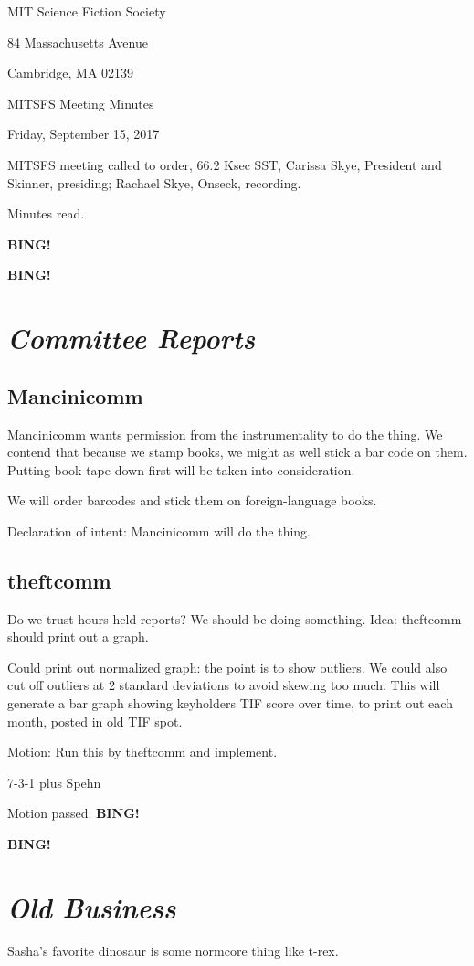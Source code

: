 \documentclass[10pt]{article}
\newcommand{\bing}{{\bf BING!} }
\newcommand{\goto}[1]{\bing \vskip 12pt \section*{{\em{#1}}}}
\newcommand{\ps}{ plus Spehn\xspace}
\newcommand{\skinner}{Carissa Skye, President and Skinner}
\newcommand{\onseck}{Rachael Skye, Onseck}
\newcommand{\meetingdate}{Friday, September 15, 2017}
\begin{document}
\begin{center}

MIT Science Fiction Society

84 Massachusetts Avenue

Cambridge, MA 02139

\vspace{12pt}

MITSFS Meeting Minutes

\meetingdate

\end{center}

\vspace{18pt}

\setlength{\parskip}{6pt}

\noindent
MITSFS meeting called to order, 66.2 Ksec SST,
\skinner, presiding; \onseck, recording.

Minutes read.

\bing

\goto{Committee Reports}
\subsection{Mancinicomm}
Mancinicomm wants permission from the instrumentality to do the thing. We contend that because we stamp books, we might as well stick a bar code on them. Putting book tape down first will be taken into consideration.

We will order barcodes and stick them on foreign-language books.

Declaration of intent: Mancinicomm will do the thing.

\subsection{theftcomm}
Do we trust hours-held reports? We should be doing something.
Idea: theftcomm should print out a graph.

Could print out normalized graph: the point is to show outliers. We could also cut off outliers at 2 standard deviations to avoid skewing too much. This will generate a bar graph showing keyholders TIF score over time, to print out each month, posted in old TIF spot.

Motion: Run this by theftcomm and implement.

7-3-1\ps

Motion passed.
\bing

\goto{Old Business}

Sasha's favorite dinosaur is some normcore thing like t-rex.
\end{document}
